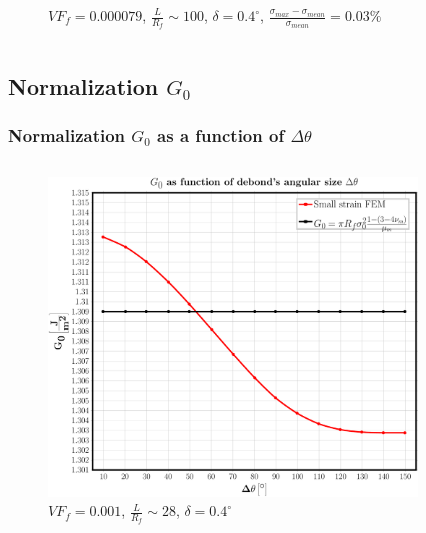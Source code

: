 \documentclass[first,firstsupp,lastsupp,last,hyperref,table]{ETHclass}
\begin{document}
\begin{frame}
\begin{columns}
\begin{column}{0.55\textwidth}
\begin{figure}
\caption{\scriptsize  $VF_{f}=0.000079$, $\frac{L}{R_{f}}\sim 100$, $\delta = 0.4^{\circ}$, $\frac{\sigma_{max}-\sigma_{mean}}{\sigma_{mean}}=0.03\%$}
\end{figure}
\end{column}
\end{columns}
\end{frame}

\subsection{Normalization $G_{0}$}

\begin{frame}
\frametitle{\small Normalization $G_{0}$ as a function of $\Delta\theta$}
\vspace{-0.5cm}
\centering
\begin{columns}
\begin{column}{0.55\textwidth}
\begin{figure}
\includegraphics[width=\columnwidth]{2017-06-23_AbqRunSummary_SingleFiberEqRfSmallFiniteStrain_G0_Summary.pdf}
\caption{\scriptsize $VF_{f}=0.001$, $\frac{L}{R_{f}}\sim 28$, $\delta = 0.4^{\circ}$}
\end{figure}
\end{column}
\begin{column}{0.55\textwidth}
\begin{figure}

\end{figure}
\end{column}
\end{columns}
\end{frame}
\end{document}
